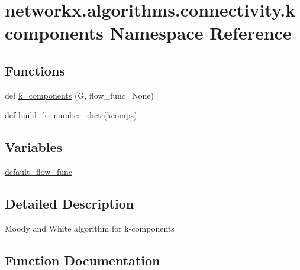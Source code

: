 \hypertarget{namespacenetworkx_1_1algorithms_1_1connectivity_1_1kcomponents}{}\section{networkx.\+algorithms.\+connectivity.\+kcomponents Namespace Reference}
\label{namespacenetworkx_1_1algorithms_1_1connectivity_1_1kcomponents}
\subsection*{Functions}
\begin{DoxyCompactItemize}
\item 
def \hyperlink{namespacenetworkx_1_1algorithms_1_1connectivity_1_1kcomponents_ae2314668d4376801aeb121c05ab0f8c2}{k\+\_\+components} (G, flow\+\_\+func=None)
\item 
def \hyperlink{namespacenetworkx_1_1algorithms_1_1connectivity_1_1kcomponents_afad2610d2cb515f474b19dea0576a829}{build\+\_\+k\+\_\+number\+\_\+dict} (kcomps)
\end{DoxyCompactItemize}
\subsection*{Variables}
\begin{DoxyCompactItemize}
\item 
\hyperlink{namespacenetworkx_1_1algorithms_1_1connectivity_1_1kcomponents_ad7090c4be5ef6cba73ea7fd8089cde02}{default\+\_\+flow\+\_\+func}
\end{DoxyCompactItemize}


\subsection{Detailed Description}
\begin{DoxyVerb}Moody and White algorithm for k-components
\end{DoxyVerb}
 

\subsection{Function Documentation}
\mbox{\label{namespacenetworkx_1_1algorithms_1_1connectivity_1_1kcomponents_afad2610d2cb515f474b19dea0576a829}} 
